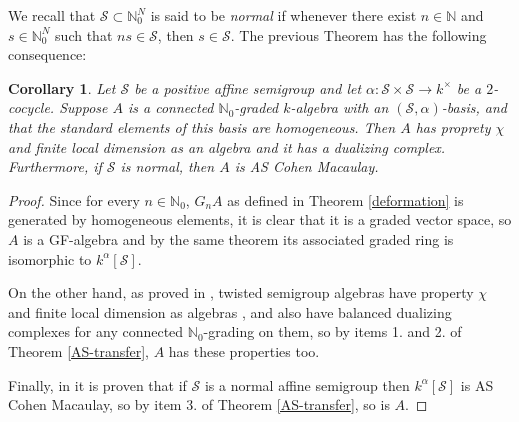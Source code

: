 \documentclass[11pt,fleqn]{article}
\theoremstyle{plain}
\newtheorem{Corollary}[Theorem]{Corollary}
\theoremstyle{remark}
\theoremstyle{definition}
\newcommand\NN{\mathbb N}
\renewcommand\to{\longrightarrow}
\renewcommand\S{\mathcal S}
\begin{document}
We recall that $\S \subset \NN_0^N$ is said to be \emph{normal} if whenever
there exist $n \in \NN$ and $s \in \NN_0^N$ such that $n s \in \S$, then $s \in \S$. The
previous Theorem has the following consequence:
\begin{Corollary}
\label{transfer-regularity}
	Let $\S$ be a positive affine semigroup and let $\alpha: \S \times \S \to
	k^\times$ be a $2$-cocycle. Suppose $A$ is a connected $\NN_0$-graded
	$k$-algebra with an $(\S,\alpha)$-basis, and that the standard elements of this
	basis are homogeneous. Then $A$ has proprety $\chi$ and finite local dimension as
	an algebra and it has a dualizing complex. Furthermore, if $\S$ is normal, then
	$A$ is AS Cohen Macaulay.
\end{Corollary}
\begin{proof}
	Since for every $n \in \NN_0$, $G_n A$ as defined in Theorem \ref{deformation} is
	generated by homogeneous elements, it is clear that it is a graded vector space,
	so $A$ is a GF-algebra and by the same theorem its associated graded ring is
	isomorphic to $k^\alpha[\S]$. 
	
	On the other hand, as proved in \cite{RZ2}, twisted semigroup algebras have
	property $\chi$ and finite local dimension as algebras , and also have balanced 
	dualizing complexes for any connected $\NN_0$-grading on them, so by items 1. and 
	2. of Theorem \ref{AS-transfer}, $A$ has these properties too.

	Finally, in \cite{RZ2} it is proven that if $\S$ is a normal affine semigroup then
	$k^\alpha[\S]$ is AS Cohen Macaulay, so by item 3. of Theorem \ref{AS-transfer},
	so is $A$.
\end{proof}
\end{document}

